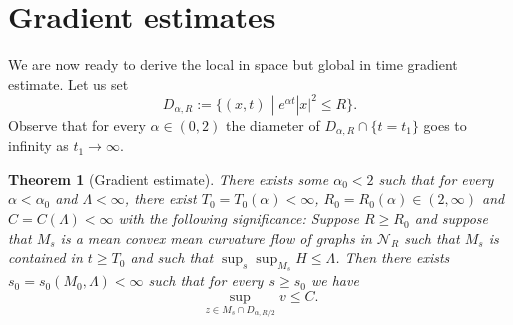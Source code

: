 \documentclass[leqno,11pt]{amsart}
\newtheorem{theorem}{Theorem}[section]
\theoremstyle{definition}
\begin{document}
\section{Gradient estimates}

We are now ready to derive the local in space but global in time gradient estimate. Let us set
\begin{equation}
D_{\alpha,R}:=\{(x,t)\;|\; e^{\alpha t}|x|^2\leq R\}.
\end{equation}
Observe that for every $\alpha\in (0,2)$ the diameter of $D_{\alpha,R}\cap \{t=t_1\}$ goes to infinity as $t_1\rightarrow \infty$. 

\begin{theorem}[Gradient estimate]\label{grad_est}
There exists some $\alpha_0<2$ such that for every $\alpha<\alpha_0$ and $\Lambda<\infty$, there exist $T_0=T_0(\alpha)<\infty$, $R_0=R_0(\alpha){\in (2,\infty)}$ and  $C=C(\Lambda)<\infty$ with the following significance: Suppose $R\geq R_0$ and suppose that $M_s$ is a mean convex mean curvature flow of graphs in $\mathcal{N}_R$ such that $M_s$ is contained in $t\geq T_0$ and such that $\sup_s\sup_{M_s}H \leq \Lambda$. {
 Then there exists $s_0=s_0(M_0,\Lambda)<\infty$ such that for every $s\geq s_0$ we have 
\begin{equation}
\sup_{z\in M_s \cap D_{\alpha,R/2}} v \leq C.
\end{equation}
}
\end{theorem}
\end{document}
